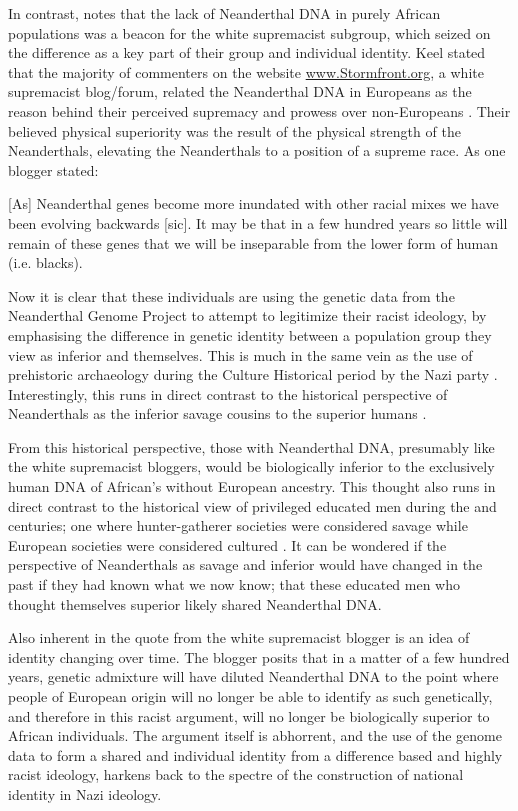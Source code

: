 In contrast, \textcite{Keel_2010} notes that the lack of Neanderthal DNA in purely African populations was a beacon for the white supremacist subgroup, which seized on the difference as a key part of their group and individual identity. Keel stated that the majority of commenters on the website \url{www.Stormfront.org}, a white supremacist blog/forum, related the Neanderthal DNA in Europeans as the reason behind their perceived supremacy and prowess over non-Europeans \parencite{Keel_2010}. Their believed physical superiority was the result of the physical strength of the Neanderthals, elevating the Neanderthals to a position of a supreme race. 
As one blogger stated:

\begin{aquote}{\cite{Keel_2010}}
[As] Neanderthal genes become more inundated with other racial mixes we have been evolving backwards [sic]. It may be that in a few hundred years so little will remain of these genes that we will be inseparable from the lower form of human (i.e. blacks).
\end{aquote}
Now it is clear that these individuals are using the genetic data from the Neanderthal Genome Project to attempt to legitimize their racist ideology, by emphasising the difference in genetic identity between a population group they view as inferior and themselves. 
This is much in the same vein as the use of prehistoric archaeology during the Culture Historical period by the Nazi party \parencite{Arnold_1992}. Interestingly, this runs in direct contrast to the historical perspective of Neanderthals as the inferior savage cousins to the superior humans \parencite{King_1864}. 

From this historical perspective, those with Neanderthal DNA, presumably like the white supremacist bloggers, would be biologically inferior to the exclusively human DNA of African's without European ancestry. This thought also runs in direct contrast to the historical view of privileged educated men during the  and  centuries; one where hunter-gatherer societies were considered savage while European societies were considered cultured \parencite{Ellingson_2001}. It can be wondered if the perspective of Neanderthals as savage and inferior would have changed in the past if they had known what we now know; that these educated men who thought themselves superior likely shared Neanderthal DNA.

Also inherent in the quote from the white supremacist blogger is an idea of identity changing over time. The blogger posits that in a matter of a few hundred years, genetic admixture will have diluted Neanderthal DNA to the point where people of European origin will no longer be able to identify as such genetically, and therefore in this racist argument, will no longer be biologically superior to African individuals. The argument itself is abhorrent, and the use of the genome data to form a shared and individual identity from a difference based and highly racist ideology, harkens back to the spectre of the construction of national identity in Nazi ideology. 

